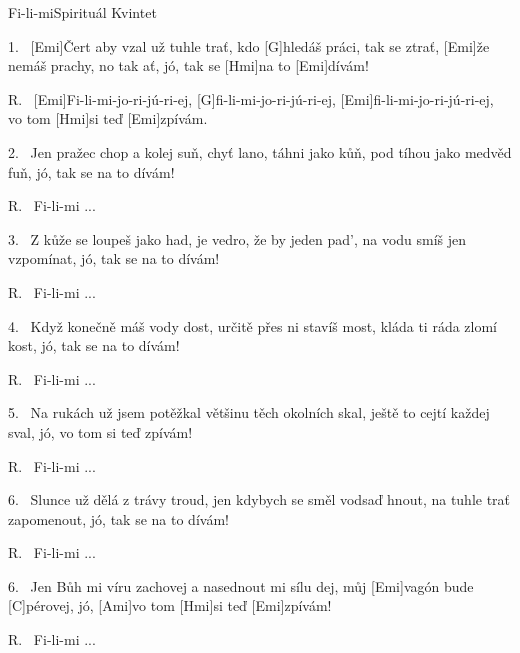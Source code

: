 \begin{song}{Fi-li-mi}{Spirituál Kvintet}

\begin{xverse}{1.~}
[Emi]{Čert} aby vzal už tuhle trať, kdo [G]hledáš práci, tak se ztrať,
[Emi]{že} nemáš prachy, no tak ať, jó, tak se [Hmi]na to [Emi]dívám!
\end{xverse}

\begin{xverse}{R.~}
[Emi]Fi-li-mi-jo-ri-jú-ri-ej,  [G]fi-li-mi-jo-ri-jú-ri-ej,
[Emi]fi-li-mi-jo-ri-jú-ri-ej, vo tom [Hmi]si teď [Emi]zpívám.
\end{xverse}

\begin{xverse}{2.~}
Jen pražec chop a kolej suň, chyť lano, táhni jako kůň,
pod tíhou jako medvěd fuň, jó, tak se na to dívám!
\end{xverse}

\begin{xverse}{R.~}
Fi-li-mi ...
\end{xverse}

\begin{xverse}{3.~}
Z kůže se loupeš jako had, je vedro, že by jeden pad',
na vodu smíš jen vzpomínat, jó, tak se na to dívám!
\end{xverse}

\begin{xverse}{R.~}
Fi-li-mi ...
\end{xverse}

\begin{xverse}{4.~}
Když konečně máš vody dost, určitě přes ni stavíš most,
kláda ti ráda zlomí kost, jó, tak se na to dívám!
\end{xverse}

\begin{xverse}{R.~}
Fi-li-mi ...
\end{xverse}

\begin{xverse}{5.~}
Na rukách už jsem potěžkal většinu těch okolních skal,
ještě to cejtí každej sval, jó, vo tom si teď zpívám!
\end{xverse}

\begin{xverse}{R.~}
Fi-li-mi ...
\end{xverse}

\begin{xverse}{6.~}
Slunce už dělá z trávy troud,
jen kdybych se směl vodsaď hnout,
na tuhle trať zapomenout, jó, tak se na to dívám!
\end{xverse}

\begin{xverse}{R.~}
Fi-li-mi ...
\end{xverse}

\begin{xverse}{6.~}
Jen Bůh mi víru zachovej a nasednout mi sílu dej,
můj [Emi]vagón bude [C]pérovej,
jó, [Ami]vo tom [Hmi]si teď [Emi]zpívám!
\end{xverse}

\begin{xverse}{R.~}
Fi-li-mi ...
\end{xverse}

\end{song}

